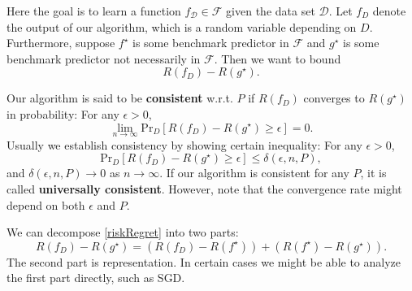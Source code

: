 \documentclass[openany]{book}
\theoremstyle{definition}
\theoremstyle{remark}
\begin{document}
Here the goal is to learn a function $f_{\mathcal{D}}\in \mathcal{F}$ given the data set $\mathcal{D}$. Let $f_{D}$ denote the output of our algorithm, which is a random variable depending on $D$. Furthermore, suppose $f^{\star}$ is some benchmark predictor in $\mathcal{F}$ and $g^{\star}$ is some benchmark predictor not necessarily in $\mathcal{F}$. Then we want to bound
\begin{equation}\label{riskRegret}
    R(f_{D})-R(g^{\star}).
\end{equation}

Our algorithm is said to be \textbf{consistent} w.r.t. $P$ if $R(f_{D})$ converges to $R(g^{\star})$ in probability: For any $\epsilon>0$,
\begin{equation}
    \lim_{n\to\infty}\mathrm{Pr}_{D}\left[R(f_{D})-R(g^{\star})\ge\epsilon\right]=0.
\end{equation}
Usually we establish consistency by showing certain inequality: For any $\epsilon>0$,
\begin{equation}
    \mathrm{Pr}_{D}\left[R(f_{D})-R(g^{\star})\ge\epsilon\right]\le\delta(\epsilon,n,P),
\end{equation}
and $\delta(\epsilon,n,P)\to0$ as $n\to\infty$. If our algorithm is consistent for any $P$, it is called \textbf{universally consistent}. However, note that the convergence rate might depend on both $\epsilon$ and $P$.

We can decompose \eqref{riskRegret} into two parts:
\begin{equation}
    R(f_D)-R(g^{\star})=\left(R(f_D)-R(f^{\star})\right)+\left(R(f^{\star})-R(g^{\star})\right).
\end{equation}
The second part is representation. In certain cases we might be able to analyze the first part directly, such as SGD.
\end{document}
